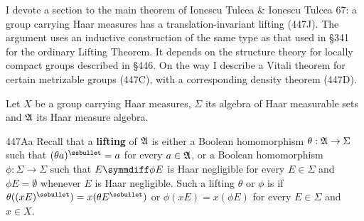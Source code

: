 
\def\undphi{\underline{\phi}\vthsp}
\def\undpsi{\underline{\psi}\vthsp}
\def\undtheta{\underline{\theta}}
\def\BbbR{\mathchoice{\hbox{$\Bbb R$\hskip0.02em}}
  {\hbox{$\Bbb R$\hskip0.02em}}
  {\hbox{$\scriptstyle\Bbb R$\hskip0.04em}}
  {\hbox{$\scriptscriptstyle\Bbb R$\hskip0.04em}}}

\def\chaptername{Topological groups}
\def\sectionname{Translation-invariant liftings}


I devote a section to the main theorem of
{\smc Ionescu Tulcea \& Ionescu Tulcea 67}:
a group carrying Haar measures has a
translation-invariant lifting (447J).   The argument uses an inductive
construction of the same type as that used in \S341 for the ordinary
Lifting Theorem.   It depends on the structure theory for locally
compact groups described in \S446.   On the way I describe a Vitali
theorem for certain metrizable groups (447C), with a corresponding
density theorem (447D).


 Let $X$ be a group carrying
Haar measures, $\Sigma$ its algebra of Haar measurable sets and $\frak A$
its Haar measure algebra.

\spheader 447Aa Recall that a {\bf lifting} of $\frak A$ is either a
Boolean homomorphism $\theta:\frak A\to\Sigma$ such that
$(\theta a)^{\ssbullet}=a$ for every $a\in\frak A$,
or a Boolean homomorphism
$\phi:\Sigma\to\Sigma$ such that $E\symmdiff\phi E$ is Haar negligible
for every $E\in\Sigma$ and $\phi E=\emptyset$ whenever $E$ is Haar
negligible.   Such a lifting $\theta$ or $\phi$ is {\bf
\lti} if $\theta((xE)^{\ssbullet})=x(\theta E^{\ssbullet})$ or
$\phi(xE)=x(\phi E)$ for every $E\in\Sigma$ and $x\in X$.


